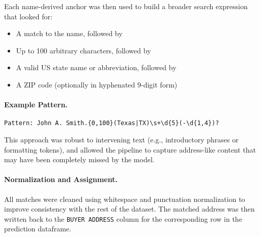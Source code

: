 \documentclass{article}
\begin{document}
Each name-derived anchor was then used to build a broader search expression that looked for:
\begin{itemize}
    \item A match to the name, followed by
    \item Up to 100 arbitrary characters, followed by
    \item A valid US state name or abbreviation, followed by
    \item A ZIP code (optionally in hyphenated 9-digit form)
\end{itemize}

\paragraph{Example Pattern.}
\begin{verbatim}
Pattern: John A. Smith.{0,100}(Texas|TX)\s+\d{5}(-\d{1,4})?
\end{verbatim}

This approach was robust to intervening text (e.g., introductory phrases or formatting tokens), and allowed the pipeline to capture address-like content that may have been completely missed by the model. \\

\paragraph{Normalization and Assignment.}
All matches were cleaned using whitespace and punctuation normalization to improve consistency with the rest of the dataset. The matched address was then written back to the \texttt{BUYER ADDRESS} column for the corresponding row in the prediction dataframe. 

\vspace{8mm} %
\end{document}
